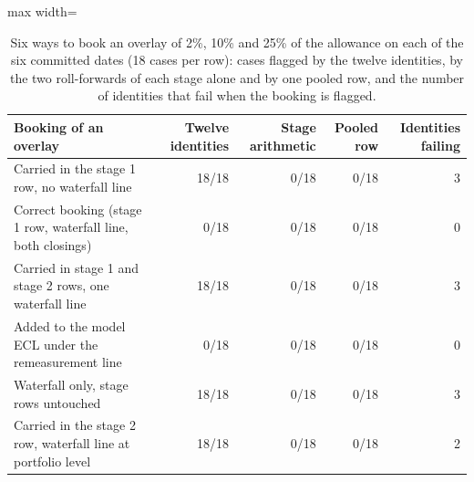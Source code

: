 \begin{table}[htbp]
\centering
\small
\caption{Six ways to book an overlay of 2\%, 10\% and 25\% of the allowance on each of the six committed dates (18 cases per row): cases flagged by the twelve identities, by the two roll-forwards of each stage alone and by one pooled row, and the number of identities that fail when the booking is flagged.}
\label{tab:placement}
\begin{adjustbox}{max width=\textwidth}
\begin{tabular}{p{6.6cm}rrrr}
\toprule
Booking of an overlay & Twelve identities & Stage arithmetic & Pooled row & Identities failing \\
\midrule
Carried in the stage 1 row, no waterfall line & 18/18 & 0/18 & 0/18 & 3 \\
Correct booking (stage 1 row, waterfall line, both closings) & 0/18 & 0/18 & 0/18 & 0 \\
Carried in stage 1 and stage 2 rows, one waterfall line & 18/18 & 0/18 & 0/18 & 3 \\
Added to the model ECL under the remeasurement line & 0/18 & 0/18 & 0/18 & 0 \\
Waterfall only, stage rows untouched & 18/18 & 0/18 & 0/18 & 3 \\
Carried in the stage 2 row, waterfall line at portfolio level & 18/18 & 0/18 & 0/18 & 2 \\
\bottomrule
\end{tabular}
\end{adjustbox}
\end{table}
